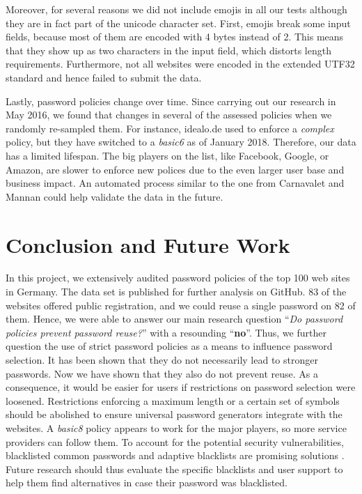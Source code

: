 Moreover, for several reasons we did not include emojis in all our tests although they are in fact part of the unicode character set. First, emojis break some input fields, because most of them are encoded with 4 bytes instead of 2. This means that they show up as two characters in the input field, which distorts length requirements. Furthermore, not all websites were encoded in the extended UTF32 standard and hence failed to submit the data. 

Lastly, password policies change over time. Since carrying out our research in May 2016, we found that changes in several of the assessed policies when we randomly re-sampled them. For instance, idealo.de used to enforce a \textit{complex} policy, but they have switched to a \textit{basic6} as of January 2018. Therefore, our data has a limited lifespan. The big players on the list, like Facebook, Google, or Amazon, are slower to enforce new polices due to the even larger user base and business impact. An automated process similar to the one from Carnavalet and Mannan \cite{Carnavalet2014AnalyzingPWStrengthMeters} could help validate the data in the future. 

\section{Conclusion and Future Work}
In this project, we extensively audited password policies of the top 100 web sites in Germany. The data set is published for further analysis on GitHub. 83 of the websites offered public registration, and we could reuse a single password on 82 of them. Hence, we were able to answer our main research question ``\textit{Do password policies prevent password reuse?}'' with a resounding ``\textbf{no}''. Thus, we further question the use of strict password policies as a means to influence password selection. It has been shown that they do not necessarily lead to stronger passwords. Now we have shown that they also do not prevent reuse. As a consequence, it would be easier for users if restrictions on password selection were loosened. Restrictions enforcing a maximum length or a certain set of symbols should be abolished to ensure universal password generators integrate with the websites. A \textit{basic8} policy appears to work for the major players, so more service providers can follow them. To account for the potential security vulnerabilities, blacklisted common passwords and adaptive blacklists are promising solutions \cite{Habib2017Blacklists, Segreti2017AdaptivePolicies}.  Future research should thus evaluate the specific blacklists and user support to help them find alternatives in case their password was blacklisted. 

